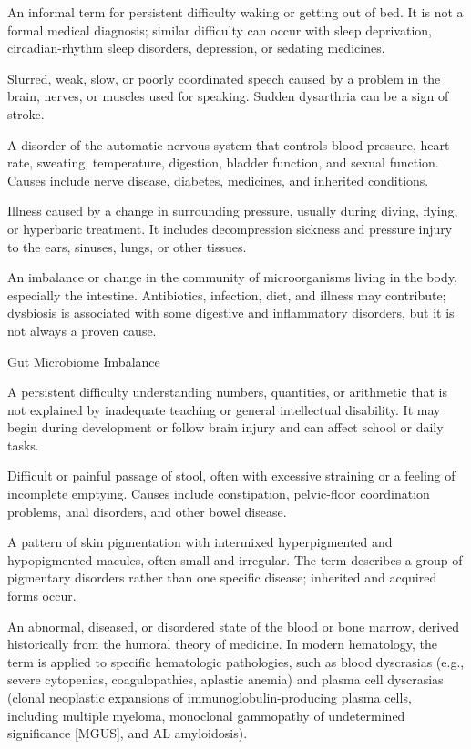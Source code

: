  An informal term for persistent difficulty waking or getting out of bed. It is not a formal medical diagnosis; similar difficulty can occur with sleep deprivation, circadian-rhythm sleep disorders, depression, or sedating medicines.

 Slurred, weak, slow, or poorly coordinated speech caused by a problem in the brain, nerves, or muscles used for speaking. Sudden dysarthria can be a sign of stroke.

 A disorder of the automatic nervous system that controls blood pressure, heart rate, sweating, temperature, digestion, bladder function, and sexual function. Causes include nerve disease, diabetes, medicines, and inherited conditions.

 Illness caused by a change in surrounding pressure, usually during diving, flying, or hyperbaric treatment. It includes decompression sickness and pressure injury to the ears, sinuses, lungs, or other tissues.

 An imbalance or change in the community of microorganisms living in the body, especially the intestine. Antibiotics, infection, diet, and illness may contribute; dysbiosis is associated with some digestive and inflammatory disorders, but it is not always a proven cause.

\synonyms
Gut Microbiome Imbalance

 A persistent difficulty understanding numbers, quantities, or arithmetic that is not explained by inadequate teaching or general intellectual disability. It may begin during development or follow brain injury and can affect school or daily tasks.

 Difficult or painful passage of stool, often with excessive straining or a feeling of incomplete emptying. Causes include constipation, pelvic-floor coordination problems, anal disorders, and other bowel disease.

 A pattern of skin pigmentation with intermixed hyperpigmented and hypopigmented macules, often small and irregular. The term describes a group of pigmentary disorders rather than one specific disease; inherited and acquired forms occur.

 An abnormal, diseased, or disordered state of the blood or bone marrow, derived historically from the humoral theory of medicine. In modern hematology, the term is applied to specific hematologic pathologies, such as blood dyscrasias (e.g., severe cytopenias, coagulopathies, aplastic anemia) and plasma cell dyscrasias (clonal neoplastic expansions of immunoglobulin-producing plasma cells, including multiple myeloma, monoclonal gammopathy of undetermined significance [MGUS], and AL amyloidosis).

